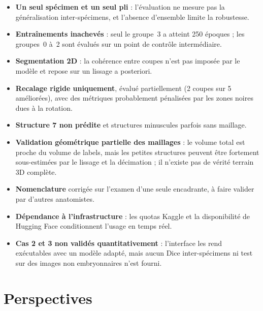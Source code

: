 \documentclass[12pt,a4paper]{report}
\begin{document}
\begin{itemize}
    \item \textbf{Un seul spécimen et un seul pli} : l'évaluation ne mesure pas la généralisation inter-spécimens, et l'absence d'ensemble limite la robustesse.
    \item \textbf{Entraînements inachevés} : seul le groupe~3 a atteint 250 époques ; les groupes~0 à~2 sont évalués sur un point de contrôle intermédiaire.
    \item \textbf{Segmentation 2D} : la cohérence entre coupes n'est pas imposée par le modèle et repose sur un lissage a posteriori.
    \item \textbf{Recalage rigide uniquement}, évalué partiellement (2 coupes sur 5 améliorées), avec des métriques probablement pénalisées par les zones noires dues à la rotation.
    \item \textbf{Structure 7 non prédite} et structures minuscules parfois sans maillage.
    \item \textbf{Validation géométrique partielle des maillages} : le volume total est proche du volume de labels, mais les petites structures peuvent être fortement sous-estimées par le lissage et la décimation ; il n'existe pas de vérité terrain 3D complète.
    \item \textbf{Nomenclature} corrigée sur l'examen d'une seule encadrante, à faire valider par d'autres anatomistes.
    \item \textbf{Dépendance à l'infrastructure} : les quotas Kaggle et la disponibilité de Hugging Face conditionnent l'usage en temps réel.
    \item \textbf{Cas 2 et 3 non validés quantitativement} : l'interface les rend exécutables avec un modèle adapté, mais aucun Dice inter-spécimens ni test sur des images non embryonnaires n'est fourni.
\end{itemize}

\section*{Perspectives}
\end{document}
